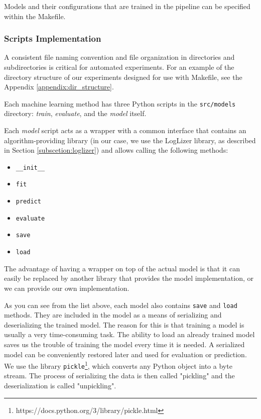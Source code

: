  \begin{figure}[!h] 
\end{figure}

Models and their configurations that are trained in the pipeline can be specified within the Makefile.

\subsubsection*{Scripts Implementation}
 A consistent file naming convention and file organization in directories and subdirectories is critical for automated experiments. For an example of the directory structure of our experiments designed for use with Makefile, see the Appendix \ref{appendix:dir_structure}.
 
 Each machine learning method has three Python scripts in the \texttt{src/models} directory: \textit{train}, \textit{evaluate}, and the \textit{model} itself. 
 
 Each \textit{model} script acts as a wrapper with a common interface that contains an algorithm-providing library (in our case, we use the LogLizer library, as described in Section \ref{subscetion:loglizer}) and allows calling the following methods:
 
\begin{itemize}
    \item \texttt{\_\_init\_\_}
    \item \texttt{fit}
    \item \texttt{predict}
    \item \texttt{evaluate}
    \item \texttt{save}
    \item \texttt{load}
\end{itemize}

The advantage of having a wrapper on top of the actual model is that it can easily be replaced by another library that provides the model implementation, or we can provide our own implementation.

As you can see from the list above, each model also contains \texttt{save} and \texttt{load} methods. They are included in the model as a means of serializing and deserializing the trained model. The reason for this is that training a model is usually a very time-consuming task. The ability to load an already trained model saves us the trouble of training the model every time it is needed. A serialized model can be conveniently restored later and used for evaluation or prediction. We use the library \texttt{pickle}\footnote{https://docs.python.org/3/library/pickle.html}, which converts any Python object into a byte stream. The process of serializing the data is then called "pickling" and the deserialization is called "unpickling".

